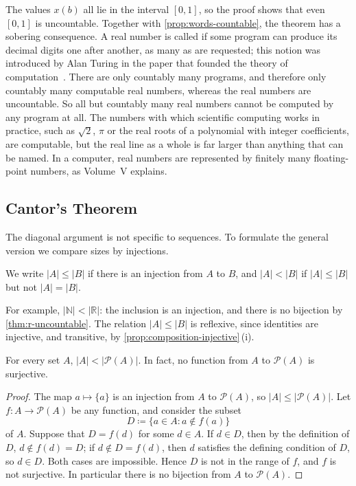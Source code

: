 The values $x(b)$ all lie in the interval $[0,1]$, so the proof shows that even $[0,1]$ is uncountable. Together with \cref{prop:words-countable}, the theorem has a sobering consequence. A real number is called  if some program can produce its decimal digits one after another, as many as are requested; this notion was introduced by Alan Turing in the paper that founded the theory of computation~\cite{turing1936}. There are only countably many programs, and therefore only countably many computable real numbers, whereas the real numbers are uncountable. So all but countably many real numbers cannot be computed by any program at all. The numbers with which scientific computing works in practice, such as $\sqrt2$, $\pi$ or the real roots of a polynomial with integer coefficients, are computable, but the real line as a whole is far larger than anything that can be named. In a computer, real numbers are represented by finitely many floating-point numbers, as Volume~V explains.

\subsection{Cantor's Theorem}

The diagonal argument is not specific to sequences. To formulate the general version we compare sizes by injections.

\begin{definition}
\label{def:card-le}
We write $|A|\le|B|$ if there is an injection from $A$ to $B$, and $|A|<|B|$ if $|A|\le|B|$ but not $|A|=|B|$.
\end{definition}

For example, $|\mathbb N|<|\mathbb R|$: the inclusion is an injection, and there is no bijection by \cref{thm:r-uncountable}. The relation $|A|\le|B|$ is reflexive, since identities are injective, and transitive, by \cref{prop:composition-injective}\,(i).

\begin{theorem}
\label{thm:cantor}
For every set $A$, $|A|<|\mathcal P(A)|$. In fact, no function from $A$ to $\mathcal P(A)$ is surjective.
\end{theorem}

\begin{proof}
The map $a\mapsto\{a\}$ is an injection from $A$ to $\mathcal P(A)$, so $|A|\le|\mathcal P(A)|$. Let $f\colon A\to\mathcal P(A)$ be any function, and consider the subset
\[
D\coloneqq\{a\in A: a\notin f(a)\}
\]
of $A$. Suppose that $D=f(d)$ for some $d\in A$. If $d\in D$, then by the definition of $D$, $d\notin f(d)=D$; if $d\notin D=f(d)$, then $d$ satisfies the defining condition of $D$, so $d\in D$. Both cases are impossible. Hence $D$ is not in the range of $f$, and $f$ is not surjective. In particular there is no bijection from $A$ to $\mathcal P(A)$.
\end{proof}

